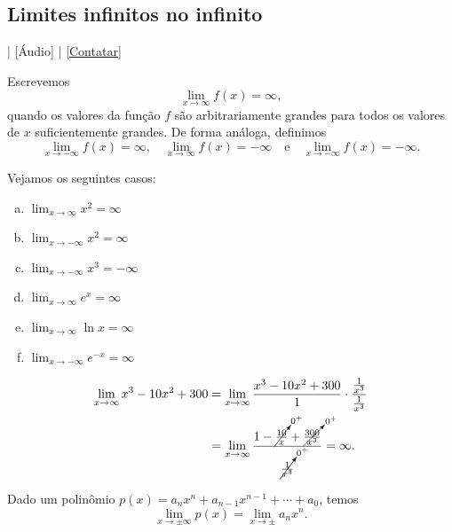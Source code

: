 \subsection{Limites infinitos no infinito}

\begin{flushright}
  [Vídeo] | [Áudio] | \href{https://phkonzen.github.io/notas/contato.html}{[Contatar]}
\end{flushright}

Escrevemos
\begin{equation}
  \lim_{x\to\infty} f(x)=\infty,
\end{equation}
quando os valores da função $f$ são arbitrariamente grandes para todos os valores de $x$ suficientemente grandes. De forma análoga, definimos
\begin{equation}
  \lim_{x\to -\infty} f(x)=\infty,\quad\lim_{x\to \infty} f(x)=-\infty\quad\text{e}\quad\lim_{x\to -\infty} f(x)=-\infty.
\end{equation}

\begin{ex}
  Vejamos os seguintes casos:
  \begin{enumerate}[a)]
  \item $\displaystyle\lim_{x\to\infty} x^2 = \infty$
  \item $\displaystyle\lim_{x\to -\infty} x^2 = \infty$
  \item $\displaystyle\lim_{x\to -\infty} x^3 = -\infty$
  \item $\displaystyle\lim_{x\to \infty} e^x = \infty$
  \item $\displaystyle\lim_{x\to \infty} \ln x = \infty$
  \item $\displaystyle\lim_{x\to -\infty} e^{-x} = \infty$
  \end{enumerate}
\end{ex}

\begin{ex}\label{ex:liminf_poli}
  \begin{align}
    \lim_{x\to \infty} x^3 - 10x^2 + 300 &= \lim_{x\to \infty} \frac{x^3 - 10x^2 + 300}{1}\cdot\frac{\frac{1}{x^3}}{\frac{1}{x^3}}\\
                                         &= \lim_{x\to \infty} \frac{1 - \cancelto{0^+}{\frac{10}{x}} + \cancelto{0^+}{\frac{300}{x^3}}}{\cancelto{0^+}{\frac{1}{x^3}}} = \infty.                                   
  \end{align}
\end{ex}

\begin{prop}
  Dado um polinômio $p(x) = a_nx^n + a_{n-1}x^{n-1} + \cdots + a_0$, temos
  \begin{equation}
    \lim_{x\to \pm\infty} p(x) = \lim_{x\to\pm} a_nx^n.
  \end{equation}
\end{prop}

